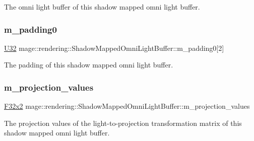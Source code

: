 The omni light buffer of this shadow mapped omni light buffer. \hypertarget{structmage_1_1rendering_1_1_shadow_mapped_omni_light_buffer_a01a76a39534ba04a2b1fe77ae5d1522c}{}\label{structmage_1_1rendering_1_1_shadow_mapped_omni_light_buffer_a01a76a39534ba04a2b1fe77ae5d1522c} 
\subsubsection{\texorpdfstring{m\+\_\+padding0}{m\_padding0}}
{\footnotesize\ttfamily \hyperlink{namespacemage_a41c104c036fba3756a74e19f793eeaa1}{U32} mage\+::rendering\+::\+Shadow\+Mapped\+Omni\+Light\+Buffer\+::m\+\_\+padding0\mbox{[}2\mbox{]}}

The padding of this shadow mapped omni light buffer. \hypertarget{structmage_1_1rendering_1_1_shadow_mapped_omni_light_buffer_a29016735134bb44c6c6f0d52fbf9ef2c}{}\label{structmage_1_1rendering_1_1_shadow_mapped_omni_light_buffer_a29016735134bb44c6c6f0d52fbf9ef2c} 
\subsubsection{\texorpdfstring{m\+\_\+projection\+\_\+values}{m\_projection\_values}}
{\footnotesize\ttfamily \hyperlink{namespacemage_aa87237ad091f5cd7da612b8523fc108f}{F32x2} mage\+::rendering\+::\+Shadow\+Mapped\+Omni\+Light\+Buffer\+::m\+\_\+projection\+\_\+values}

The projection values of the light-\/to-\/projection transformation matrix of this shadow mapped omni light buffer. 
